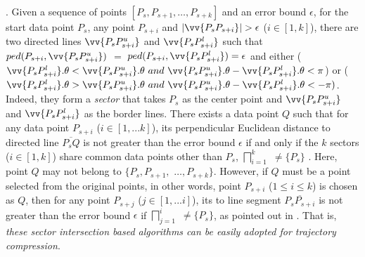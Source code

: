 .
Given a sequence of points $[P_{s}, P_{s+1}, \ldots, P_{s+k}]$ and an error bound $\epsilon$,
for the start data point $P_s$,
any point $P_{s+i}$ and $|\vv{P_sP_{s+i}}|>\epsilon$ ($i\in[1, k]$), there are two directed lines $\vv{P_sP^u_{s+i}}$ and $\vv{P_sP^l_{s+i}}$ such that $ped(P_{s+i}, \vv{P_sP^u_{s+i}})$ $=$ $ped(P_{s+i}, \vv{P_sP^l_{s+i}}) = \epsilon$ and either ($\vv{P_sP^l_{s+i}}.\theta < \vv{P_sP^u_{s+i}}.\theta ~and~\vv{P_sP^u_{s+i}}.\theta - \vv{P_sP^l_{s+i}}.\theta <\pi$) or ($\vv{P_sP^l_{s+i}}.\theta > \vv{P_sP^u_{s+i}}.\theta ~and~ \vv{P_sP^u_{s+i}}.\theta - \vv{P_sP^l_{s+i}}.\theta < -\pi)$. Indeed, they form a \emph{sector}  that takes $P_s$ as the center point and $\vv{P_sP^u_{s+i}}$ and $\vv{P_sP^l_{s+i}}$ as the border lines.
There exists a data point $Q$ such that for any data point $P_{s+i}$ ($i \in [1, ... k]$), its perpendicular Euclidean distance to
directed line $\overline{P_sQ}$ is not greater than the error bound $\epsilon$ if and only if the $k$ sectors  ($i\in[1,k]$) share common data points other than $P_s$, \ie $\bigsqcap_{i=1}^{k}$ $\ne \{P_s\}$ \cite{Williams:Longest, Sklansky:Cone,Zhao:Sleeve}.
%
Here, point $Q$ may not belong to $\{P_{s}, P_{s+1},$ $\ldots, P_{s+k}\}$.
However, if $Q$ must be a point selected from the original points, in other words, point $P_{s+i}$ ($1\le i\le k$) is chosen as $Q$, then
for any point $P_{s+j}$ ($j \in [1, ... i]$), its \ped to
line segment $\overline{P_sP_{s+i}}$ is not greater than the error bound $\epsilon$ if $\bigsqcap_{j=1}^{i}$ $\ne \{P_s\}$, as pointed out in \cite{Zhao:Sleeve}.
That is, {\em these sector intersection based algorithms can be easily adopted for trajectory compression}.
%

